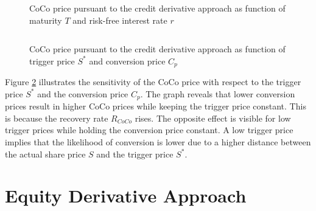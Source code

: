 \begin{figure}[H]
\centering
{}
    \caption[CoCo price pursuant to the credit derivative approach as function of maturity and interest rate]{CoCo price pursuant to the credit derivative approach as function of maturity $T$ and risk-free interest rate $r$}
  \label{fig:cd2}
  \end{figure}
$ $ \\
\begin{figure}[H]
\centering
    \caption[CoCo price pursuant to the credit derivative approach as function of trigger price and conversion price]{CoCo price pursuant to the credit derivative approach as function of trigger price $S^*$ and conversion price $C_p$}
  \label{fig:cd3}
  \end{figure}

Figure \ref{fig:cd3} illustrates the sensitivity of the CoCo price with respect to the trigger price $S^*$ and the conversion price $C_p$. The graph reveals that lower conversion prices result in higher CoCo prices while keeping the trigger price constant. This is because the recovery rate $R_{CoCo}$ rises. The opposite effect is visible for low trigger prices while holding the conversion price constant. A low trigger price implies that the likelihood of conversion is lower due to a higher distance between the actual share price $S$ and the trigger price $S^*$.

\section{Equity Derivative Approach}\label{sensiequity}

